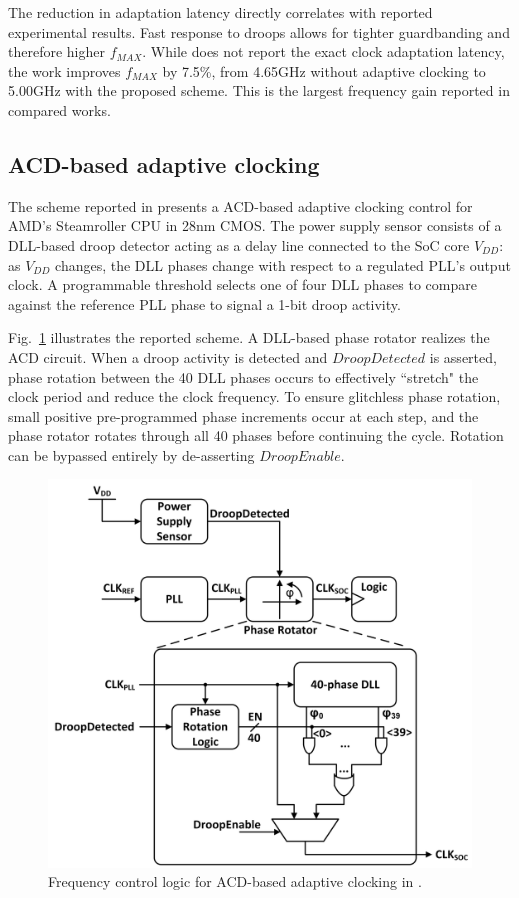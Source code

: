 \documentclass[twoside,9pt,journal,letterpage]{IEEEtran}
\begin{document}
The reduction in adaptation latency directly correlates with reported experimental results. Fast response to droops allows for tighter guardbanding and therefore higher $f_{MAX}$. While \cite{hashimoto2018} does not report the exact clock adaptation latency, the work improves $f_{MAX}$ by 7.5\%, from 4.65GHz without adaptive clocking to 5.00GHz with the proposed scheme. This is the largest frequency gain reported in compared works.

\vspace{-10pt}
\subsection{ACD-based adaptive clocking}
\label{sec:details_acd}
The scheme reported in \cite{wilcox2015} presents a ACD-based adaptive clocking control for AMD's Steamroller CPU in 28nm CMOS. The power supply sensor consists of a DLL-based droop detector acting as a delay line connected to the SoC core $V_{DD}$: as $V_{DD}$ changes, the DLL phases change with respect to a regulated PLL's output clock. A programmable threshold selects one of four DLL phases to compare against the reference PLL phase to signal a 1-bit droop activity.

Fig.\ \ref{fig:detail_acd} illustrates the reported scheme. A DLL-based phase rotator realizes the ACD circuit. When a droop activity is detected and $DroopDetected$ is asserted, phase rotation between the 40 DLL phases occurs to effectively ``stretch" the clock period and reduce the clock frequency. To ensure glitchless phase rotation, small positive pre-programmed phase increments occur at each step, and the phase rotator rotates through all 40 phases before continuing the cycle. Rotation can be bypassed entirely by de-asserting $DroopEnable$. 

\begin{figure}[h]
	\centering
	\includegraphics[width=0.6\columnwidth]{fig_detail_acd}
	\caption{Frequency control logic for ACD-based adaptive clocking in \cite{wilcox2015}.}
	\label{fig:detail_acd}
\end{figure}
\end{document}
